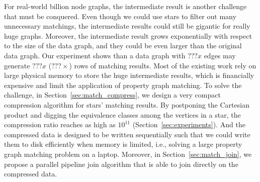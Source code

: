 For real-world billion node graphs, the intermediate result is another challenge that must be conquered.
Even though we could use stars to filter out many unnecessary matchings,
the intermediate results could still be gigantic for really huge graphs.
Moreover, the intermediate result grows exponentially with respect to the size of the data graph,
and they could be even larger than the original data graph.
Our experiment shows than a data graph with $???x$ edges may generate $???x$ ($???\times$) rows of matching results.
Most of the existing work rely on large physical memory to store the huge intermediate results,
which is financially expensive and limit the application of property graph matching.
To solve the challenge, in Section~\ref{sec:match_compress}, we design a very compact compression algorithm for stars' matching results.
By postponing the Cartesian product and digging the equivalence classes among the vertices in a star,
the compression ratio reaches as high as $10^{11}$ (Section~\ref{sec:experiments}).
And the compressed data is designed to be written sequentially such that we could write them to disk efficiently when memory is limited, i.e., solving a large property graph matching problem on a laptop.
Moreover, in Section~\ref{sec:match_join}, we propose a parallel pipeline join algorithm that is able to join directly on the compressed data.

